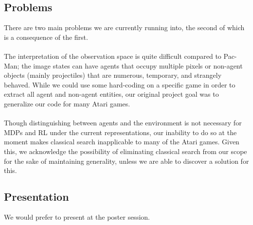 \documentclass{NSF}
\begin{document}
\subsection{Problems}
There are two main problems we are currently running into, the second of which is a consequence of the first.
\\\\
The interpretation of the observation space is quite difficult compared to Pac-Man; the image states can have agents that occupy multiple pixels or non-agent objects (mainly projectiles) that are numerous, temporary, and strangely behaved. While we could use some hard-coding on a specific game in order to extract all agent and non-agent entities, our original project goal was to generalize our code for many Atari games.
\\\\
Though distinguishing between agents and the environment is not necessary for MDPs and RL under the current representations, our inability to do so at the moment makes classical search inapplicable to many of the Atari games. Given this, we acknowledge the possibility of eliminating classical search from our scope for the sake of maintaining generality, unless we are able to discover a solution for this.
\\

\subsection{Presentation}
We would prefer to present at the poster session.
\end{document}

